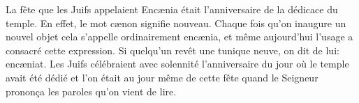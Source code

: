  La fête que les Juifs appelaient Encænia
	était l’anniversaire de la dédicace du temple.
En effet, le mot cænon signifie nouveau.
Chaque fois qu’on inaugure un nouvel objet
	cela s’appelle ordinairement encænia,
	et même aujourd’hui l’usage a consacré cette expression.
Si quelqu’un revêt une tunique neuve, on dit de lui: encæniat.
Les Juifs célébraient avec solennité
	l’anniversaire du jour où le temple avait été dédié
	et l’on était au jour même de cette fête
	quand le Seigneur prononça les paroles qu’on vient de lire.
